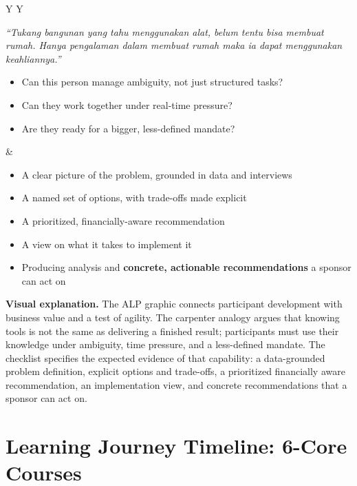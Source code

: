 \documentclass[10pt]{article}
\newcommand{\visualexplanation}[1]{%
  \begin{tcolorbox}[colback=lightgray,colframe=navy!35,boxrule=0.5pt,
    arc=2mm,left=2mm,right=2mm,top=1.5mm,bottom=1.5mm]
  \textbf{Visual explanation.} #1
  \end{tcolorbox}}
\begin{document}
\begin{tabularx}{\textwidth}{Y Y}
\begin{tcolorbox}[colback=lightgray,colframe=lightgray,arc=4mm,title=The Carpenter Analogy,fonttitle=\Large\bfseries\color{navy}]
\emph{``Tukang bangunan yang tahu menggunakan alat, belum tentu bisa membuat rumah. Hanya pengalaman dalam membuat rumah maka ia dapat menggunakan keahliannya.''}
\begin{itemize}
\item Can this person manage ambiguity, not just structured tasks?
\item Can they work together under real-time pressure?
\item Are they ready for a bigger, less-defined mandate?
\end{itemize}
\end{tcolorbox}
&
\begin{tcolorbox}[colback=lightgray,colframe=lightgray,arc=4mm,title={An ALP is a ``stretch'' assignment},fonttitle=\Large\bfseries\color{navy}]
\begin{itemize}[label=\color{green}$\checkmark$]
\item A clear picture of the problem, grounded in data and interviews
\item A named set of options, with trade-offs made explicit
\item A prioritized, financially-aware recommendation
\item A view on what it takes to implement it
\item Producing analysis and \textbf{concrete, actionable recommendations} a sponsor can act on
\end{itemize}
\end{tcolorbox}
\end{tabularx}

\visualexplanation{The ALP graphic connects participant development with business value and a test of agility. The carpenter analogy argues that knowing tools is not the same as delivering a finished result; participants must use their knowledge under ambiguity, time pressure, and a less-defined mandate. The checklist specifies the expected evidence of that capability: a data-grounded problem definition, explicit options and trade-offs, a prioritized financially aware recommendation, an implementation view, and concrete recommendations that a sponsor can act on.}

\section{Learning Journey Timeline: 6-Core Courses}
\end{document}
